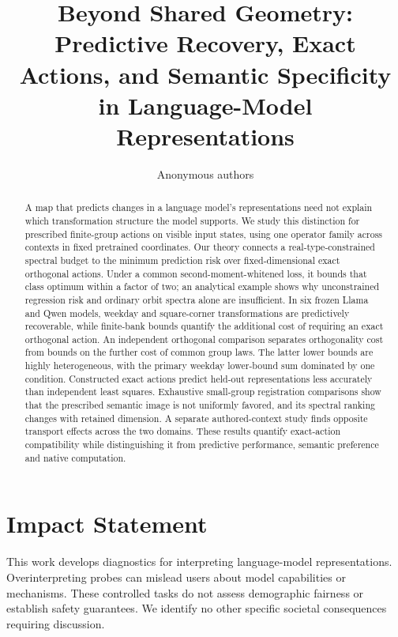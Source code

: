 \documentclass[10pt]{article}
\title{Beyond Shared Geometry: Predictive Recovery, Exact Actions, and Semantic Specificity in Language-Model Representations}
\author{Anonymous authors}
\begin{document}
\maketitle
\raggedbottom

\begin{abstract}
A map that predicts changes in a language model's representations need not explain which transformation structure the model supports. We study this distinction for prescribed finite-group actions on visible input states, using one operator family across contexts in fixed pretrained coordinates. Our theory connects a real-type-constrained spectral budget to the minimum prediction risk over fixed-dimensional exact orthogonal actions. Under a common second-moment-whitened loss, it bounds that class optimum within a factor of two; an analytical example shows why unconstrained regression risk and ordinary orbit spectra alone are insufficient. In six frozen Llama and Qwen models, weekday and square-corner transformations are predictively recoverable, while finite-bank bounds quantify the additional cost of requiring an exact orthogonal action. An independent orthogonal comparison separates orthogonality cost from bounds on the further cost of common group laws. The latter lower bounds are highly heterogeneous, with the primary weekday lower-bound sum dominated by one condition. Constructed exact actions predict held-out representations less accurately than independent least squares. Exhaustive small-group registration comparisons show that the prescribed semantic image is not uniformly favored, and its spectral ranking changes with retained dimension. A separate authored-context study finds opposite transport effects across the two domains. These results quantify exact-action compatibility while distinguishing it from predictive performance, semantic preference and native computation.
\end{abstract}








\FloatBarrier
\label{sec:main-end}

\section*{Impact Statement}
This work develops diagnostics for interpreting language-model representations. Overinterpreting probes can mislead users about model capabilities or mechanisms. These controlled tasks do not assess demographic fairness or establish safety guarantees. We identify no other specific societal consequences requiring discussion.
\end{document}
